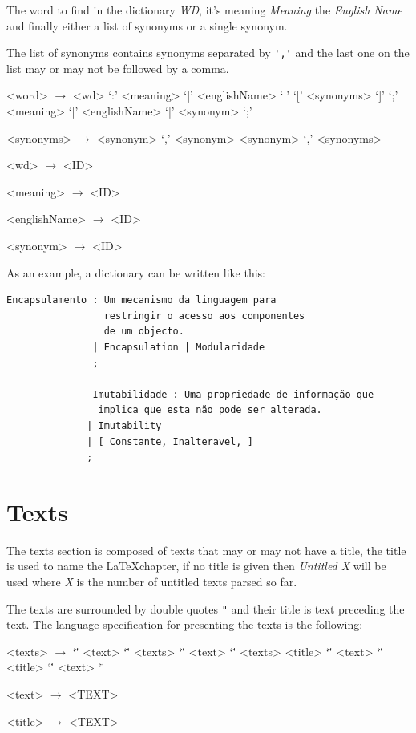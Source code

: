 \documentclass[a4paper]{report}
\begin{document}
The word to find in the dictionary \textit{WD}, it's meaning \textit{Meaning}
the \textit{English Name} and finally either a list of synonyms or a single
synonym.

The list of synonyms contains synonyms separated by \verb!','! and the last one
on the list may or may not be followed by a comma.

\begin{grammar}
    <word> $\to$ <wd> `:' <meaning> `|' <englishName> `|' `[' <synonyms> `]' `;'
    \alt <meaning> `|' <englishName> `|' <synonym> `;'

    <synonyms> $\to$ <synonym> `,'
    \alt <synonym>
    \alt <synonym> `,' <synonyms>

    <wd> $\to$ <ID>

    <meaning> $\to$ <ID>

    <englishName> $\to$ <ID>

    <synonym> $\to$ <ID>
\end{grammar}

As an example, a dictionary can be written like this:

\begin{verbatim}
Encapsulamento : Um mecanismo da linguagem para
                 restringir o acesso aos componentes
                 de um objecto.
               | Encapsulation | Modularidade
               ;

               Imutabilidade : Uma propriedade de informação que
                implica que esta não pode ser alterada.
              | Imutability
              | [ Constante, Inalteravel, ]
              ;
\end{verbatim}

\section{Texts}\label{sec:texts}

The texts section is composed of texts that may or may not have a title, the
title is used to name the \LaTeX chapter, if no title is given then
\textit{Untitled X} will be used where \textit{X} is the number of untitled
texts parsed so far.

The texts are surrounded by double quotes \verb!"! and their title is text
preceding the text. The language specification for presenting the texts is the
following:

\begin{grammar}
    <texts> $\to$ `\"' <text> `\"'
    \alt <texts> `\"' <text> `\"'
    \alt <texts> <title> `\"' <text> `\"'
    \alt <title> `\"' <text> `\"'

    <text> $\to$ <TEXT>

    <title> $\to$ <TEXT>
\end{grammar}
\end{document}
